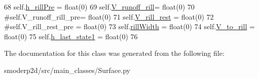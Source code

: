 \begin{DoxyCode}
68     self.\hyperlink{classsmoderp2d_1_1src_1_1main__classes_1_1Surface_1_1SurArrs_aaa24f875929bb936865d78e9fefa65a7}{h\_rillPre} =    float(0)
69     self.\hyperlink{classsmoderp2d_1_1src_1_1main__classes_1_1Surface_1_1SurArrs_a4694f9abfba295f68a313407b61894dc}{V\_runoff\_rill}= float(0)
70     \textcolor{comment}{#self.V\_runoff\_rill\_pre= float(0)}
71     self.\hyperlink{classsmoderp2d_1_1src_1_1main__classes_1_1Surface_1_1SurArrs_a4fd51b130216b239e3b56afe85d984e7}{V\_rill\_rest} =      float(0)
72     \textcolor{comment}{#self.V\_rill\_rest\_pre =  float(0)}
73     self.\hyperlink{classsmoderp2d_1_1src_1_1main__classes_1_1Surface_1_1SurArrs_aa26b1528adae60c9964db0b02ed5ebd2}{rillWidth}   =      float(0)
74     self.\hyperlink{classsmoderp2d_1_1src_1_1main__classes_1_1Surface_1_1SurArrs_a8e9091c6dba8d972439069d549db61ff}{V\_to\_rill}   =      float(0)
75     self.\hyperlink{classsmoderp2d_1_1src_1_1main__classes_1_1Surface_1_1SurArrs_a80b8f31208066d10c7a605af36def0e8}{h\_last\_state1} =    float(0)
76 

\end{DoxyCode}


The documentation for this class was generated from the following file\-:\begin{DoxyCompactItemize}
\item 
smoderp2d/src/main\-\_\-classes/Surface.\-py\end{DoxyCompactItemize}
